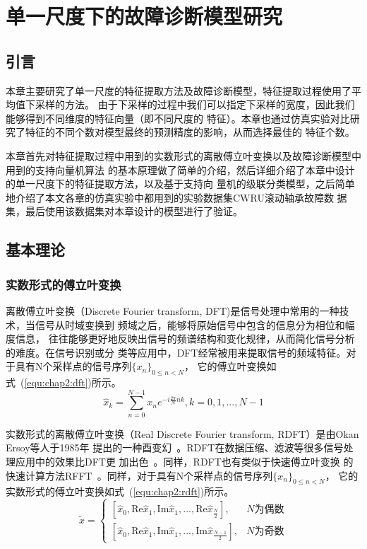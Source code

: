 \chapter{单一尺度下的故障诊断模型研究}
\label{cha:chapter2}

\section{引言}

本章主要研究了单一尺度的特征提取方法及故障诊断模型，特征提取过程使用了平均值下采样的方法。
由于下采样的过程中我们可以指定下采样的宽度，因此我们能够得到不同维度的特征向量（即不同尺度的
特征）。本章也通过仿真实验对比研究了特征的不同个数对模型最终的预测精度的影响，从而选择最佳的
特征个数。

本章首先对特征提取过程中用到的实数形式的离散傅立叶变换以及故障诊断模型中用到的支持向量机算法
的基本原理做了简单的介绍，然后详细介绍了本章中设计的单一尺度下的特征提取方法，以及基于支持向
量机的级联分类模型，之后简单地介绍了本文各章的仿真实验中都用到的实验数据集CWRU滚动轴承故障数
据集，最后使用该数据集对本章设计的模型进行了验证。

\section{基本理论}

\subsection{实数形式的傅立叶变换}
\label{subsection:rdft}

离散傅立叶变换（Discrete Fourier transform, DFT)是信号处理中常用的一种技术，当信号从时域变换到
频域之后，能够将原始信号中包含的信息分为相位和幅度信息，
往往能够更好地反映出信号的频谱结构和变化规律，从而简化信号分析的难度。在信号识别或分
类等应用中，DFT经常被用来提取信号的频域特征。对于具有N个采样点的信号序列$\{x_n\}_{0\leq n < N}$，
它的傅立叶变换如式~(\ref{equ:chap2:dft})所示。
\begin{equation}
\label{equ:chap2:dft}
  \hat{x}_k=\sum_{n=0}^{N-1}x_n e^{-i\frac{2\pi}{N}nk}, k=0,1,...,N-1
\end{equation}

实数形式的离散傅立叶变换（Real Discrete Fourier transform, RDFT）是由Okan Ersoy等人于1985年
提出的一种酉变幻~\cite{ersoy1985real}。RDFT在数据压缩、滤波等很多信号处理应用中的效果比DFT更
加出色~\cite{ersoy1988fast}。同样，RDFT也有类似于快速傅立叶变换
的快速计算方法RFFT~\cite{ersoy1988fast}。同样，对于具有N个采样点的信号序列$\{x_n\}_{0\leq n < N}$，
它的实数形式的傅立叶变换如式~(\ref{equ:chap2:rdft})所示。
\begin{equation}
\label{equ:chap2:rdft}
  \widetilde{x}=
  \begin{cases}
    \left[\hat{x}_0, \text{Re}\hat{x}_1, \text{Im}\hat{x}_1, ..., \text{Re}\hat{x}_{\frac{N}{2}}\right],  & N\text{为偶数}\\
    \left[\hat{x}_0, \text{Re}\hat{x}_1, \text{Im}\hat{x}_1, ..., \text{Im}\hat{x}_{\frac{N-1}{2}}\right],& N\text{为奇数}
  \end{cases}
\end{equation}

